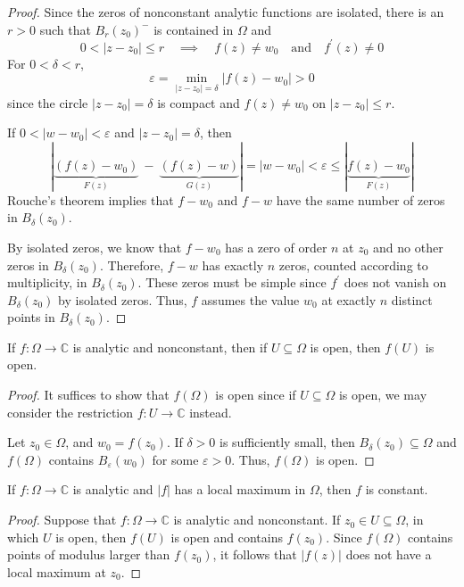 \documentclass[12pt]{article}
\begin{document}
\begin{proof}
    Since the zeros of nonconstant analytic functions are isolated, there is an $r>0$ such that $B_{r}(z_{0})^{-}$ is contained in $\Omega$ and
$$0<|z-z_{0}|\leq r\quad\implies\quad f(z)\neq w_{0}\quad\text{and}\quad f^{\prime}(z)\neq0$$
For $0<\delta<r$,
$$\varepsilon=\min_{|z-z_{0}|=\delta}|f(z)-w_{0}|>0$$
since the circle $|z-z_{0}|=\delta$ is compact and $f(z)\neq w_{0}$ on $|z-z_{0}|\leq r$.

If $0<|w-w_{0}|<\varepsilon$ and $|z-z_{0}|=\delta$, then
$$|\underbrace{(f(z)-w_{0})}_{F(z)}\ -\ \underbrace{(f(z)-w)}_{G(z)}|=|w-w_{0}|<\varepsilon\leq|\underbrace{f(z)-w_{0}}_{F(z)}|$$
Rouche's theorem implies that $f-w_{0}$ and $f-w$ have the same number of zeros in $B_{\delta}(z_{0})$. 

By isolated zeros, we know that $f-w_{0}$ has a zero of order $n$ at $z_{0}$ and no other zeros in $B_{\delta}(z_{0})$. Therefore, $f-w$ has exactly $n$ zeros, counted according to multiplicity, in $B_{\delta}(z_{0})$. These zeros must be simple since $f^{\prime}$ does not vanish on $B_{\delta}(z_{0})$ by isolated zeros. Thus, $f$ assumes the value $w_0$ at exactly $n$ distinct points in $B_{\delta}(z_{0})$.
\end{proof}

\begin{corollary}
    If $f:\Omega\to\mathbb{C}$ is analytic and nonconstant, then if $U\subseteq\Omega$ is open, then $f(U)$ is open.
\end{corollary}
\begin{proof}
    It suffices to show that $f(\Omega)$ is open since if $U\subseteq\Omega$ is open, we may consider the restriction $f:U\to\mathbb{C}$ instead. 
    
    Let $z_{0}\in\Omega$, and $w_{0}=f(z_{0})$. If $\delta>0$ is sufficiently small, then $B_{\delta}(z_{0})\subseteq\Omega$ and $f(\Omega)$ contains $B_{\varepsilon}(w_{0})$ for some $\varepsilon>0$. Thus, $f(\Omega)$ is open.
\end{proof}

\begin{theorem}
    If $f:\Omega\to\mathbb{C}$ is analytic and $|f|$ has a local maximum in $\Omega$, then $f$ is constant.
\end{theorem}
\begin{proof}
    Suppose that $f:\Omega\to\mathbb{C}$ is analytic and nonconstant. If $z_{0}\in U\subseteq\Omega$, in which $U$ is open, then $f(U)$ is open and contains $f(z_{0})$. Since $f(\Omega)$ contains points of modulus larger than $f(z_{0})$, it follows that $|f(z)|$ does not have a local maximum at $z_{0}$.
\end{proof}
\end{document}
